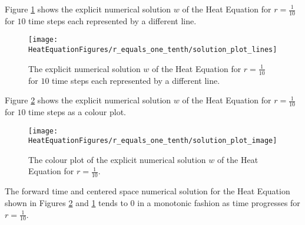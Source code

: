 \begin{example}
Figure \ref{Plot_FTCS_1_10} shows the explicit numerical solution $w$ of the Heat Equation for $r=\frac{1}{10}$ for $10$ time steps each represented by a different line. 
\begin{figure}[H]
  \caption{The explicit numerical solution $w$ of the Heat Equation for $r=\frac{1}{10}$ for $10$ time steps each represented by a different line.}
  \centering
    \texttt{[image: HeatEquationFigures/r\_equals\_one\_tenth/solution\_plot\_lines]}
        \label{Plot_FTCS_1_10}

\end{figure}
Figure \ref{Color_FTCS_1_10} shows the explicit numerical solution $w$ of the Heat Equation for $r=\frac{1}{10}$ for $10$ time steps as a colour plot. 

\begin{figure}[H]
  \caption{The colour plot of the explicit numerical solution $w$ of the Heat Equation for $r=\frac{1}{10}$.}
  \centering
    \texttt{[image: HeatEquationFigures/r\_equals\_one\_tenth/solution\_plot\_image]}
    \label{Color_FTCS_1_10}
\end{figure}
The forward time and centered space numerical solution for the Heat Equation shown in Figures \ref{Color_FTCS_1_10} and  \ref{Plot_FTCS_1_10} tends to $0$ in a monotonic fashion as time progresses for $r=\frac{1}{10}$. 
\end{example}
